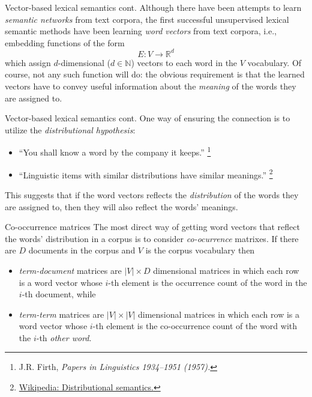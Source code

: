 \documentclass[style=upen, size=14pt]{powerdot}
\newcommand{\gold}{\color{arany}}
\theoremstyle{definition}
\begin{document}
\begin{slide}[toc=]{Vector-based lexical semantics cont.}
  Although there have been attempts to learn \emph{semantic networks} from text
  corpora, the first successful unsupervised lexical semantic methods have been
  learning \emph{\gold word vectors} from text corpora, i.e., embedding
  functions of the form
  $$
  E: V \rightarrow \mathbb{R}^d
  $$
  which assign $d$-dimensional ($d\in \mathbb N$) vectors to each word in the
  $V$ vocabulary. Of course, not any such function will do: the obvious
  requirement is that the learned vectors have to convey useful information about
  the \emph{meaning} of the words they are assigned to.
\end{slide}

\begin{slide}[toc=]{Vector-based lexical semantics cont.}
  One way of ensuring the connection is to utilize the \emph{distributional hypothesis}:
  \begin{itemize}
  \item ``You shall know a word by the company it keeps.''
    \footnote{J.R. Firth, \emph{Papers in Linguistics 1934--1951 (1957).}}
  \item ``Linguistic items with similar distributions have similar meanings.''
    \footnote{\href{https://en.wikipedia.org/wiki/Distributional_semantics}{Wikipedia:
        Distributional semantics.}}
  \end{itemize}
  This suggests that if the word vectors reflects the \emph{distribution} of the
  words they are assigned to, then they will also reflect the words' meanings.
\end{slide}

\begin{slide}[toc=]{Co-occurrence matrices}
  The most direct way of getting word vectors that reflect the words'
  distribution in a corpus is to consider \emph{co-ocurrence} matrixes. If there
  are $D$ documents in the corpus and $V$ is the corpus vocabulary then
  \begin{itemize}
  \item \emph{\gold term-document} matrices are $|V|\times D$ dimensional
    matrices in which each row is a word vector whose $i$-th element is the
    occurrence count of the word in the $i$-th document, while
  \item \emph{\gold term-term} matrices are $|V|\times |V|$ dimensional matrices
    in which each row is a word vector whose $i$-th element is the co-occurrence
    count of the word with the $i$-th \emph{other word}.
  \end{itemize}
\end{slide}
\end{document}
